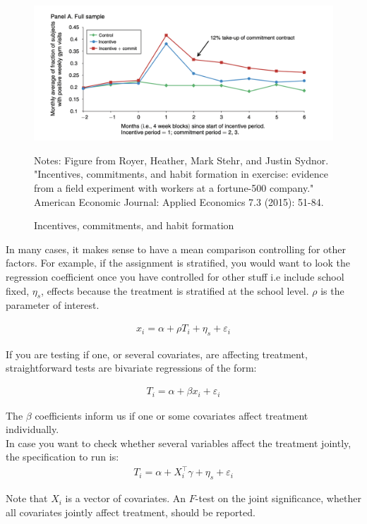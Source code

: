 \documentclass[11pt, oneside]{article}   	%
\begin{document}
\begin{figure} [H]
\vspace{0.5cm}
\begin{center}
\caption{\label{fig:aej} Incentives, commitments, and habit formation}
\includegraphics[width=120 mm, height=60 mm]{output/figures/Habit_Formation_Exercise.png} 
\end{center}
\vspace{0.1cm}
\par
\begin{minipage}{ \linewidth}
\baselineskip10pt
\scriptsize{Notes: Figure from Royer, Heather, Mark Stehr, and Justin Sydnor. "Incentives, commitments, and habit formation in exercise: evidence from a field experiment with workers at a fortune-500 company." American Economic Journal: Applied Economics 7.3 (2015): 51-84.}
\end{minipage}
\end{figure}





In many cases, it makes sense to have a mean comparison controlling for other factors. For example, if the assignment is stratified, you would want to look the regression coefficient once you have controlled for other stuff i.e include school fixed, $ \eta_s $, effects because the treatment is stratified at the school level. $\rho$ is the parameter of interest.


\begin{align*}
x_i =  \alpha + \rho T_i + \eta_s + \varepsilon_i
\end{align*}
 
 
 If you are testing if one, or several covariates, are affecting treatment, straightforward tests are bivariate regressions of the form:
 
 \begin{align*}
T_i = \alpha + \beta x_i+ \varepsilon_i
\end{align*}
 
The $\beta$ coefficients inform us if one or some covariates affect treatment individually.\\


In case you want to check whether several variables affect the treatment  jointly, the specification to run is:
 \begin{align*}
 T_i = \alpha + X_i ^\intercal \gamma+ \eta_s + \varepsilon_i
\end{align*}
 
Note that $X_i$ is a vector of covariates. An $F$-test on the joint significance, whether all covariates jointly affect treatment, should be reported.
\end{document}
